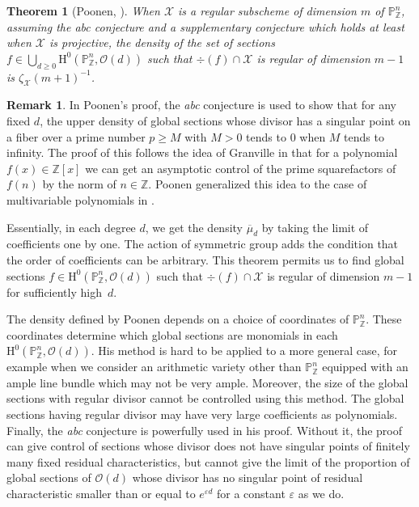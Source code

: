 \documentclass[JEP,XML,SOM,Unicode,published]{cedram}
\theoremstyle{plain}
\newtheorem{thm}{Theorem}[section]
\theoremstyle{definition}
\newtheorem*{rmq}{Remark}
\newcommand{\ho}{\mathrm{H}}
\newcommand{\X}{\mathcal{X}}
\newcommand{\Z}{\mathbb{Z}}
\newcommand{\pr}{\mathbb{P}}
\begin{document}
\begin{thm}[Poonen, {\cite[Th.\,5.1]{Po04}}]\label{poonen}
When $\X$ is a regular subscheme of dimension $m$ of $\pr^n_{\Z}$, assuming the \emph{abc} conjecture and a supplementary conjecture which holds at least when $\X$ is projective, the density of the set of sections $f\in \bigcup_{d\geq 0}\ho^0(\pr^n_{\Z}, \mathcal{O}(d))$ such that $\div (f)\cap \X$ is regular of dimension $m-1$ is $\zeta_{\X}(m+1)^{-1}$.
\end{thm}

\begin{rmq}
In Poonen's proof, the \emph{abc} conjecture is used to show that for any fixed $d$, the upper density of global sections whose divisor has a singular point on a fiber over a prime number $p\geq M$ with $M>0$ tends to $0$ when $M$ tends to infinity. The proof of this follows the idea of Granville in \cite{Gr98} that for a polynomial $f(x)\in \Z[x]$ we can get an asymptotic control of the prime squarefactors of $f(n)$ by the norm of $n\in \Z$. Poonen generalized this idea to the case of multivariable polynomials in \cite{Po03}.
\end{rmq}

Essentially, in each degree $d$, we get the density $\overline{\mu}_d$ by taking the limit of coefficients one by one. The action of symmetric group adds the condition that the order of coefficients can be arbitrary. This theorem permits us to find global sections $f\in\ho^0(\pr^n_{\Z}, \mathcal{O}(d))$ such that $\div (f)\!\cap\!\X$ is regular of dimension $m\!-\!1$ for sufficiently high~$d$.

The density defined by Poonen depends on a choice of coordinates of $\pr^n_{\Z}$. These coordinates determine which global sections are monomials in each $\ho^0(\pr^n_{\Z}, \mathcal{O}(d))$. His method is hard to be applied to a more general case, for example when we consider an arithmetic variety other than $\pr^n_{\Z}$ equipped with an ample line bundle which may not be very ample. Moreover, the size of the global sections with regular divisor cannot be controlled using this method. The global sections having regular divisor may have very large coefficients as polynomials. Finally, the \emph{abc} conjecture is powerfully used in his proof. Without it, the proof can give control of sections whose divisor does not have singular points of finitely many fixed residual characteristics, but cannot give the limit of the proportion of global sections of $\mathcal{O}(d)$ whose divisor has no singular point of residual characteristic smaller than or equal to $e^{\varepsilon d}$ for a constant $\varepsilon $ as we do.
\end{document}
